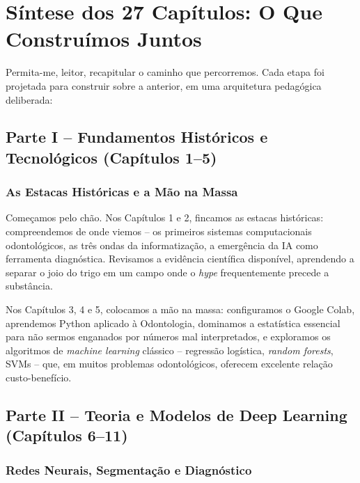 \section{Síntese dos 27 Capítulos: O Que Construímos Juntos}
\label{sec:sintese}

\nivelum

Permita-me, leitor, recapitular o caminho que percorremos. Cada etapa foi
projetada para construir sobre a anterior, em uma arquitetura pedagógica
deliberada:

\subsection{Parte I -- Fundamentos Históricos e Tecnológicos (Capítulos 1--5)}

\subsubsection{As Estacas Históricas e a Mão na Massa}

Começamos pelo chão. Nos Capítulos 1 e 2, fincamos as estacas históricas:
compreendemos de onde viemos -- os primeiros sistemas computacionais
odontológicos, as três ondas da informatização, a emergência da IA como
ferramenta diagnóstica. Revisamos a evidência científica disponível, aprendendo
a separar o joio do trigo em um campo onde o \textit{hype} frequentemente
precede a substância.

Nos Capítulos 3, 4 e 5, colocamos a mão na massa: configuramos o Google Colab,
aprendemos Python aplicado à Odontologia, dominamos a estatística essencial
para não sermos enganados por números mal interpretados, e exploramos os
algoritmos de \textit{machine learning} clássico -- regressão logística,
\textit{random forests}, SVMs -- que, em muitos problemas odontológicos,
oferecem excelente relação custo-benefício.

\subsection{Parte II -- Teoria e Modelos de Deep Learning (Capítulos 6--11)}

\subsubsection{Redes Neurais, Segmentação e Diagnóstico}

